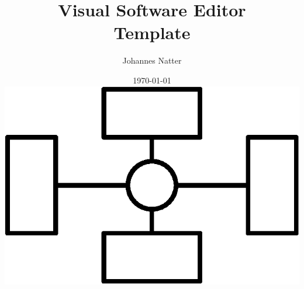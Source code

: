 \documentclass[a4paper,11pt,oneside]{book}
\begin{document}
  \title{\textbf{Visual Software Editor \\ Template}} 
  \author{Johannes Natter}
  \date{\today \\ \vspace{5cm} \includegraphics[width=100 pt]{logo}}

  \frontmatter
  \maketitle
  
  \tableofcontents
  

  \mainmatter
  
  
  

  \clearpage

  \backmatter

  \printbibliography
\end{document}
